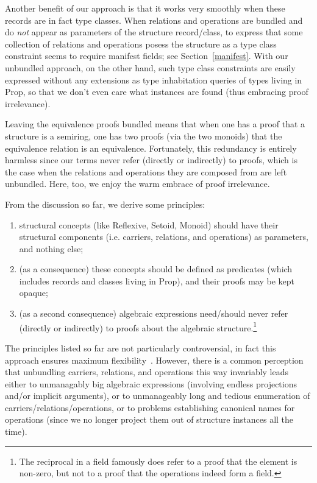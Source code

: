 \documentclass[a4paper,10pt, runningheads]{llncs}
\begin{document}
Another benefit of our approach is that it works very smoothly when these records are in fact type
classes. When relations and operations are bundled and do \emph{not} appear as parameters of the
structure record/class, to express that some collection of relations and
operations posess the structure as a type class constraint seems to require manifest fields; see
Section~\ref{manifest}. With
our unbundled approach, on the other hand, such type class constraints are easily expressed without
any extensions as type inhabitation queries
of types living in Prop, so that we don't even care what instances are found (thus embracing proof
irrelevance).

Leaving the equivalence proofs bundled means that when one has a proof that a structure
is a semiring, one has two proofs (via the two monoids) that the equivalence relation is an
equivalence. Fortunately, this redundancy is entirely harmless since our terms
never refer (directly or indirectly) to proofs, which is the case when the relations and operations
they are composed from are left unbundled. Here, too, we enjoy the warm embrace of proof
irrelevance.

From the discussion so far, we derive some principles:
\begin{enumerate}
 \item structural concepts (like Reflexive, Setoid, Monoid) should have their structural components
(i.e. carriers, relations, and operations) as parameters, and nothing else;
 \item (as a consequence) these concepts should be defined as predicates (which includes records and
classes living in Prop), and their proofs may be kept opaque;
 \item (as a second consequence) algebraic expressions need/should never refer (directly or
indirectly) to proofs about the algebraic structure.\footnote{The reciprocal in a field
famously does refer to a proof that the element is non-zero, but not to a proof that the operations
indeed form a field.}
\end{enumerate}

The principles listed so far are not particularly controversial, in fact this
approach ensures maximum flexibility~\cite{Hints}. However,
there is a common perception that unbundling carriers, relations, and operations this way invariably
leads either to unmanagably big algebraic expressions (involving endless projections and/or implicit
arguments), or to unmanageably long and tedious enumeration of carriers/relations/operations, or to
problems establishing canonical names for operations (since we no longer project them out of
structure instances all the time).
\end{document}
